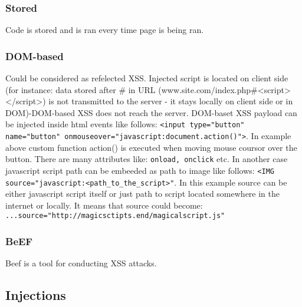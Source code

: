 \documentclass{article}[12pt]
\begin{document}
\subsubsection{Stored}  Code is stored and is ran every time page is being ran.
\subsubsection{DOM-based} Could be considered as refelected XSS. Injected script is located on client side (for instance: data stored after \# in URL (www.site.com/index.php\#<script></script>) is not transmitted to the server - it stays locally on client side or in DOM)-DOM-based XSS does not reach the server.
DOM-baset XSS payload can be injected inside html events like follows: \texttt{<input type="button" name="button" onmouseover="javascript:document.action()">}.
In example above custom function action() is executed when moving mouse coursor over the button.
There are many attributes like: \texttt{onload, onclick} etc.
In another case javascript script path can be embeeded as path to image like follows:
\texttt{<IMG source="javascript:<path\_to\_the\_script>"}.
In this example source can be either javascript script itself or just path to script located somewhere in the internet or locally.
It means that source could become:
\texttt{...source="http://magicsctipts.end/magicalscript.js"}

\subsubsection{BeEF} Beef is a tool for conducting XSS attacks.





\subsection{Injections}
\end{document}
